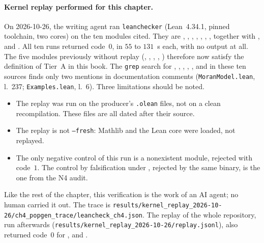 \paragraph{Kernel replay performed for this chapter.}
On 2026-10-26, the writing agent ran \texttt{leanchecker} (Lean~4.34.1, pinned toolchain, two
cores) on the ten modules cited. They are , ,
, , , ,
, together with ,  and . All ten
runs returned code~$0$, in $55$ to $131$~s each, with no output at all. The five modules previously without replay
(, , , , ) therefore now satisfy the
definition of Tier~A in this book. The \texttt{grep} search for , ,
, , ,  and  in these ten sources
finds only two mentions in documentation comments (\texttt{MoranModel.lean}, l.~237;
\texttt{Examples.lean}, l.~6). Three limitations should be noted.
\begin{itemize}[itemsep=1pt]
\item The replay was run on the producer's \texttt{.olean} files, not on a clean recompilation. These files
are all dated after their source.
\item The replay is not \texttt{--fresh}: Mathlib and the Lean core were loaded, not replayed.
\item The only negative control of this run is a nonexistent module, rejected with code~$1$. The control
by falsification under , rejected by the same binary, is the one from the N4 audit.
\end{itemize}
Like the rest of the chapter, this verification is the work of an AI agent; no human carried it out. The
trace is \texttt{results/kernel\_replay\_2026-10-26/ch4\_popgen\_trace/leancheck\_ch4.json}. The replay of the whole repository, run afterwards
(\texttt{results/kernel\_replay\_2026-10-26/replay.jsonl}), also returned code~$0$ for , 
and .

